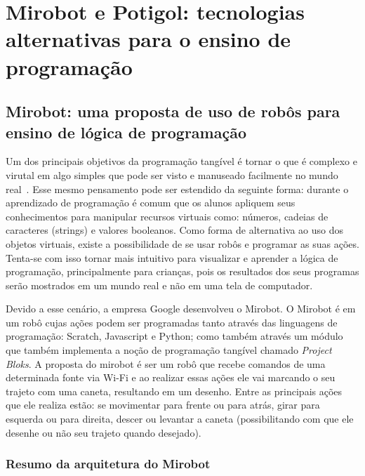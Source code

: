 \chapter{Mirobot e Potigol: tecnologias alternativas para o ensino de programação}
\label{cap:referencial}

\section{Mirobot: uma proposta de uso de robôs para ensino de lógica de
programação}
\label{sec:mirobot}

Um dos principais objetivos da programação tangível é tornar o que é complexo e
virutal em algo simples que pode ser visto e manuseado facilmente no mundo
real~\cite{Horn2008, Horn2007, McNerney2000}. Esse mesmo pensamento pode ser estendido da seguinte forma: durante o aprendizado de programação é comum que os alunos apliquem seus
conhecimentos para manipular recursos virtuais como: números, cadeias de
caracteres (strings) e valores booleanos. 
Como forma de alternativa ao uso dos
objetos virtuais, existe a possibilidade de se usar robôs e programar as suas
ações. 
Tenta-se com isso tornar mais intuitivo para visualizar e aprender a
lógica de programação, principalmente para crianças, pois os resultados dos
seus programas serão mostrados em um mundo real e não em uma tela de computador.

Devido a esse cenário, a empresa Google desenvolveu o Mirobot. O Mirobot é em um robô
cujas ações podem ser programadas tanto através das
linguagens de programação: Scratch, Javascript e Python; como também através um módulo que
também implementa a noção de programação tangível chamado \textit{Project Bloks}. 
A proposta do mirobot é ser um robô que recebe comandos de uma determinada fonte
via Wi-Fi e ao realizar essas ações ele vai marcando o seu trajeto com uma
caneta, resultando em um desenho.
Entre as principais ações que ele realiza
estão: se movimentar para frente ou para atrás, girar para esquerda ou para
direita, descer ou levantar a caneta (possibilitando com que ele desenhe ou não
seu trajeto quando desejado).


\subsection{Resumo da arquitetura do Mirobot}


